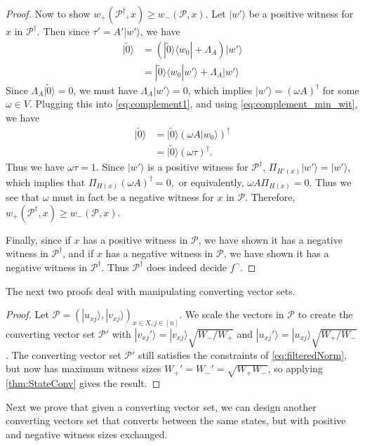 \documentclass[cleveref, autoref, thm-restate,11pt]{article}
\theoremstyle{definition}
\newcommand{\sop}[1]{{\mathcal #1}}
\newcommand{\ket}[1]{|#1\rangle}
\newcommand{\ketbra}[2]{|{#1}\rangle\!\langle{#2}|}
\newcommand{\braket}[2]{\langle{#1}|{#2}\rangle}
\renewcommand{\wp}[2]{{w_+({#1},{#2})}}
\newcommand{\wm}[2]{{w_-({#1},{#2})}}
\begin{document}
\begin{proof}
Now to show $\wp{\sop P^\dagger}{x}\geq \wm{\sop P}{x}$. Let $\ket{w'}$ be a positive
witness for $x$ in $\sop P^\dagger.$ Then since $\tau'=A'\ket{w'}$, we have
\begin{align}\label{eq:complement1}
\ket{\tilde{0}}&=(\ketbra{\tilde{0}}{w_0}+\Lambda_A)\ket{w'}\\
&=\ket{\tilde{0}}\braket{w_0}{w'}+\Lambda_A\ket{w'}
\end{align}
Since $\Lambda_A\ket{\tilde{0}}=0$, we must have $\Lambda_A\ket{w'}=0$,
which implies $\ket{w'}=(\omega A)^\dagger$ for some $\omega\in V$. Plugging
this into \cref{eq:complement1}, and using \cref{eq:complement_min_wit}, we have
\begin{align}
\ket{\tilde{0}}&=\ket{\tilde{0}}(\omega A\ket{w_0})^\dagger\\
&=\ket{\tilde{0}}(\omega \tau)^\dagger.
\end{align}
Thus we have $\omega\tau=1$. Since $\ket{w'}$ is a positive witness 
for $\sop P^\dagger$, $\Pi_{H'(x)}\ket{w'}=\ket{w'}$, which
implies that $\Pi_{H(x)}(\omega A)^\dagger=0,$ or equivalently, 
$\omega A \Pi_{H(x)}=0$. Thus we see that $\omega$ must in fact be a 
negative witness for $x$ in $\sop P$. Therefore, $\wp{\sop P^\dagger}{x}\geq \wm{\sop P}{x}$.

Finally, since if
$x$ has a positive witness in $\sop P$, we have shown it has a negative witness 
in $\sop P^\dagger$, and if
$x$ has a negative witness in $\sop P$, we have shown it has a negative witness in $\sop P^\dagger$. Thus $\sop P^\dagger$ does indeed decide $f^{\neg }.$
\end{proof}

The next two proofs deal with manipulating converting vector sets.
\scaleSC*
\begin{proof}
Let $\mathscr P=(\ket{u_{xj}},\ket{v_{xj}})_{x\in X,j\in[n]}$.
We scale the vectors in $\mathscr P$ to create the converting
vector set $\mathscr P'$ with $\ket{v_{xj}'}=\ket{v_{xj}}\sqrt{W_-/W_+}$ and 
$\ket{u_{xj}'}=\ket{u_{xj}}\sqrt{W_+/W_-}$. The converting vector set
$\mathscr P'$  still satisfies the
constraints of \cref{eq:filteredNorm}, but now has maximum witness sizes
$W_+'=W_-'=\sqrt{W_+W_-}$, so applying \cref{thm:StateConv} gives the result.
\end{proof}

Next we prove that given a converting vector set, we can design another converting 
vectors set that converts between the same states, but with positive and negative witness sizes 
exchanged.
\end{document}

